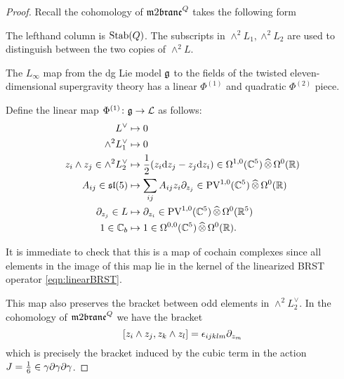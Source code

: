 \begin{proof}
Recall the cohomology of $\m2^Q$ takes the following form
\beqn 
{}
\eeqn
The lefthand column is ${\rm Stab}(Q)$. 
The subscripts in $\wedge^2 L_1, \wedge^2 L_2$ are used to distinguish between the two copies of $\wedge^2 L$.

The $L_\infty$ map from the dg Lie model $\mathfrak g$ to the fields of the twisted eleven-dimensional supergravity theory has a linear $\Phi^{(1)}$ and quadratic $\Phi^{(2)}$ piece.

Define the linear map $\Phi^{(1)} \colon \mathfrak g \to \mathcal L$ as follows:
\begin{align*}
 L^\vee & \mapsto 0 \\
 \wedge^2 L_1^\vee  & \mapsto 0 \\
z_i \wedge z_j \in \wedge^2 L^\vee_2 & \mapsto \frac12 (z_i \d z_j - z_j \d z_i) \in \Omega^{1,0} (\CC^5) \hotimes \Omega^0 (\RR) \\
A_{ij} \in \lie{sl}(5) & \mapsto \sum_{ij} A_{ij} z_i \partial_{z_j} \in \PV^{1,0}(\CC^5) \hotimes \Omega^0(\RR) \\ \partial_{z_j} \in L & \mapsto
\partial_{z_i} \in \PV^{1,0} (\CC^5) \hotimes \Omega^0 (\RR^5) \\ %
1 \in \CC_b & \mapsto 1 \in \Omega^{0,0}(\CC^5) \hotimes \Omega^0 (\RR) .
\end{align*}

It is immediate to check that this is a map of cochain complexes since all elements in the image of this map lie in the kernel of the linearized BRST operator \eqref{eqn:linearBRST}. 

This map also preserves the bracket between odd elements in $\wedge^2 L_2^\vee$. 
In the cohomology of $\m2^Q$ we have the bracket
\[
[z_i\wedge z_j , z_k \wedge z_l] = \epsilon_{ijklm} \partial_{z_m}
\]
which is precisely the bracket induced by the cubic term in the action $J = \frac16 \in \gamma \partial \gamma \partial \gamma$. 


\end{proof}
